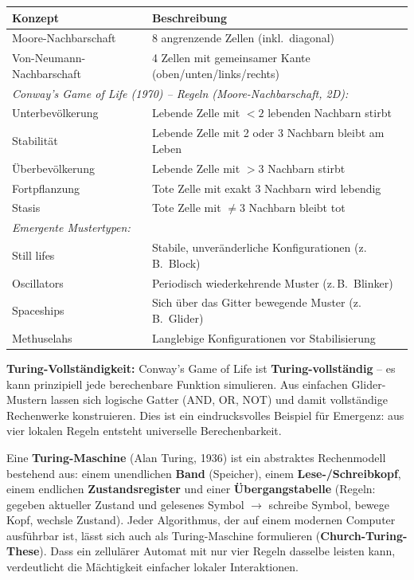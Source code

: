 \begin{table}[H]
\centering
\begin{tabular}{p{5cm} p{10cm}}
\hline
\textbf{Konzept} & \textbf{Beschreibung} \\
\hline
Moore-Nachbarschaft & 8 angrenzende Zellen (inkl.\ diagonal) \\
Von-Neumann-Nachbarschaft & 4 Zellen mit gemeinsamer Kante (oben/unten/links/rechts) \\
\hline
\multicolumn{2}{l}{\textit{Conway's Game of Life (1970) -- Regeln (Moore-Nachbarschaft, 2D):}} \\
Unterbevölkerung & Lebende Zelle mit $< 2$ lebenden Nachbarn stirbt \\
Stabilität & Lebende Zelle mit 2 oder 3 Nachbarn bleibt am Leben \\
Überbevölkerung & Lebende Zelle mit $> 3$ Nachbarn stirbt \\
Fortpflanzung & Tote Zelle mit exakt 3 Nachbarn wird lebendig \\
Stasis & Tote Zelle mit $\neq 3$ Nachbarn bleibt tot \\
\hline
\multicolumn{2}{l}{\textit{Emergente Mustertypen:}} \\
Still lifes & Stabile, unveränderliche Konfigurationen (z.\,B.\ Block) \\
Oscillators & Periodisch wiederkehrende Muster (z.\,B.\ Blinker) \\
Spaceships & Sich über das Gitter bewegende Muster (z.\,B.\ Glider) \\
Methuselahs & Langlebige Konfigurationen vor Stabilisierung \\
\hline
\end{tabular}
\end{table}


\textbf{Turing-Vollständigkeit:} Conway's Game of Life ist \textbf{Turing-vollständig} -- es kann prinzipiell jede berechenbare Funktion simulieren. Aus einfachen Glider-Mustern lassen sich logische Gatter (AND, OR, NOT) und damit vollständige Rechenwerke konstruieren. Dies ist ein eindrucksvolles Beispiel für Emergenz: aus vier lokalen Regeln entsteht universelle Berechenbarkeit.

Eine \textbf{Turing-Maschine} (Alan Turing, 1936) ist ein abstraktes Rechenmodell bestehend aus: einem unendlichen \textbf{Band} (Speicher), einem \textbf{Lese-/Schreibkopf}, einem endlichen \textbf{Zustandsregister} und einer \textbf{Übergangstabelle} (Regeln: gegeben aktueller Zustand und gelesenes Symbol $\to$ schreibe Symbol, bewege Kopf, wechsle Zustand). Jeder Algorithmus, der auf einem modernen Computer ausführbar ist, lässt sich auch als Turing-Maschine formulieren (\textbf{Church-Turing-These}). Dass ein zellulärer Automat mit nur vier Regeln dasselbe leisten kann, verdeutlicht die Mächtigkeit einfacher lokaler Interaktionen.

